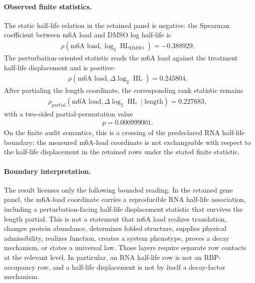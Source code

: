 \paragraph{Observed finite statistics.}
The static half-life relation in the retained panel is negative: the Spearman coefficient between m6A load and DMSO log half-life is
$$
\begin{aligned}
\rho(\text{m6A load},\log_2 \operatorname{HL}_{\mathrm{DMSO}})=-0.388929.
\end{aligned}
$$
The perturbation-oriented statistic reads the m6A load against the treatment half-life displacement and is positive:
$$
\begin{aligned}
\rho(\text{m6A load},\Delta\log_2 \operatorname{HL})=0.245804.
\end{aligned}
$$
After partialing the length coordinate, the corresponding rank statistic remains
$$
\begin{aligned}
\rho_{\mathrm{partial}}(\text{m6A load},\Delta\log_2 \operatorname{HL}\mid \text{length})=0.227683,
\end{aligned}
$$
with a two-sided partial-permutation value
$$
\begin{aligned}
p=0.000999001.
\end{aligned}
$$
On the finite audit semantics, this is a crossing of the predeclared RNA half-life boundary: the measured m6A-load coordinate is not exchangeable with respect to the half-life displacement in the retained rows under the stated finite statistic.

\paragraph{Boundary interpretation.}
The result licenses only the following bounded reading. In the retained gene panel, the m6A-load coordinate carries a reproducible RNA half-life association, including a perturbation-facing half-life displacement statistic that survives the length partial. This is not a statement that m6A load realizes translation, changes protein abundance, determines folded structure, supplies physical admissibility, realizes function, creates a system phenotype, proves a decay mechanism, or states a universal law. Those layers require separate row contacts at the relevant level. In particular, an RNA half-life row is not an RBP-occupancy row, and a half-life displacement is not by itself a decay-factor mechanism.

